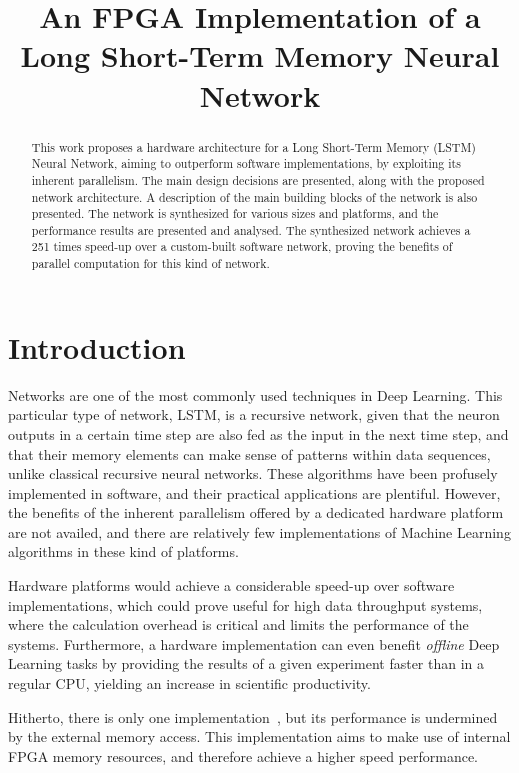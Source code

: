 \documentclass{IEEEtran}
\title{An FPGA Implementation of a Long Short-Term Memory Neural Network}
\begin{document}
\maketitle

\begin{abstract}
This work proposes a hardware architecture for a Long Short-Term Memory (LSTM) Neural Network, aiming
to outperform software implementations, by exploiting its inherent parallelism.
The main design decisions are presented, along with the proposed network architecture. A description of the main
building blocks of the network is also presented. The network is synthesized for various sizes and platforms,
and the performance results are presented and analysed. The synthesized network achieves a 251 times speed-up
over a custom-built software network, proving the benefits of parallel computation for this kind of network.
\end{abstract}


\section{Introduction}\label{sec:intro}
 Networks are one of the most commonly used techniques in Deep Learning. This
particular type of network, LSTM, is a recursive network, given that the neuron outputs in a certain
time step are also fed as the input in the next time step, and that their memory elements can make
sense of patterns within data sequences, unlike classical recursive neural networks.
These algorithms have been profusely implemented in software, and their practical applications are plentiful.
However, the benefits of the inherent parallelism offered by a dedicated hardware
platform are not availed, and there are relatively few implementations of Machine Learning algorithms in
these kind of platforms.

Hardware platforms would achieve a considerable speed-up over software implementations, which could prove
useful for high data throughput systems, where the calculation overhead is critical and limits the performance of the systems.
Furthermore, a hardware implementation can even benefit \emph{offline} Deep Learning tasks by providing the results
of a given experiment faster than in a regular CPU, yielding an increase in scientific productivity.

Hitherto, there is only one implementation~\cite{Chang15}, but its performance is undermined
by the external memory access. This implementation aims to make use of internal FPGA memory resources,
and therefore achieve a higher speed performance.
\end{document}

